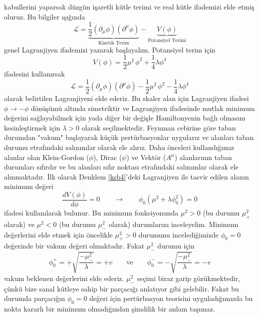 kabullerini yaparsak düzgün işaretli kütle terimi ve real kütle ifademizi elde etmiş oluruz. Bu bilgiler ışığında
$$
\mathcal{L} = \underbrace{\frac{1}{2}(\partial_{\mu}\phi)(\partial^{\mu}\phi)}_{\textrm{Kinetik Terim}} - \underbrace{ V(\phi)}_{\textrm{Potansiyel Terimi}}
$$
genel Lagranjiyen ifademizi yazarak başlayalım. Potansiyel terim için
$$
V(\phi) = \frac{1}{2} \mu^{2}\,\phi^{2} + \frac{1}{4}\lambda\phi^{4}
$$
ifadesini kullanırsak
\begin{equation} \label{ksb4}
\mathcal{L} = \frac{1}{2}(\partial_{\mu}\phi)(\partial^{\mu}\phi) - \frac{1}{2} \mu^{2}\,\phi^{2} - \frac{1}{4}\lambda\phi^{4}
\end{equation}
olarak belirtilen Lagranjiyeni elde ederiz. Bu skaler alan için Lagranjiyen ifadesi $\phi \to -\phi$ dönüşümü altında simetriktir ve Lagranjiyen ifadesinde mutlak minimum değerini sağlayabilmek için yada diğer bir değişle Hamiltonyenin bağlı olmasını kesinleştirmek için $\lambda > 0$ olarak seçilmektedir. Feynman cebirine göre  taban durumdan "vakum" başlayarak küçük  pertürbasyonlar uygularız ve alanları taban durumu etrafındaki salınımlar olarak ele alırız. Daha önceleri kullandığımız alanlar olan Klein-Gordon ($\phi$), Dirac ($\psi$) ve Vektör ($A^{\mu}$) alanlarının taban durumları sıfırdır ve bu alanları sıfır noktası etrafındaki salınımlar olarak ele alınmaktadır. İlk olarak Denklem \eqref{ksb4}'deki Lagranjiyen ile tasvir edilen alanın minimum değeri
\begin{equation} \label{ksb5}
\frac{d V(\phi)}{d\phi} = 0\qquad \to \qquad \phi_{0}(\mu^{2} + \lambda\phi_{0}^{2}) = 0
\end{equation}
ifadesi kullanılarak bulunur. Bu minimum fonksiyonunda $\mu^{2} > 0$ (bu durumu $\mu_{+}^{2}$ olarak) ve $\mu^{2} < 0$ (bu durumu $\mu_{-}^{2}$ olarak) durumlarını inceleyelim. Minimum değerlerini elde etmek için öncelikle $\mu_{+}^{2} > 0$ durumunu incelediğimizde $\phi_{0} = 0$ değerinde bir vakum değeri olmaktadır. Fakat $\mu_{-}^{2}$ durumu için 
\begin{equation} \label{ksb6}
\phi^{+}_{0} = + \sqrt{\frac{- \mu^{2}_{-} }{\lambda}} = +v \qquad \textrm{ve} \qquad
\phi^{-}_{0} = - \sqrt{\frac{- \mu^{2}_{-} }{\lambda}} = -v 
\end{equation}
vakum beklenen değerlerini elde ederiz.  $\mu_{-}^{2}$ seçimi biraz garip gözükmektedir, çünkü bize sanal kütleye sahip bir parçacığı anlatıyor gibi gelebilir. Fakat bu durumda parçacığın $\phi_{0} = 0$ değeri için pertürbasyon teorisini uyguladığımızda bu nokta kararlı bir minimum olmadığından şimdilik bir anlam taşımaz.
